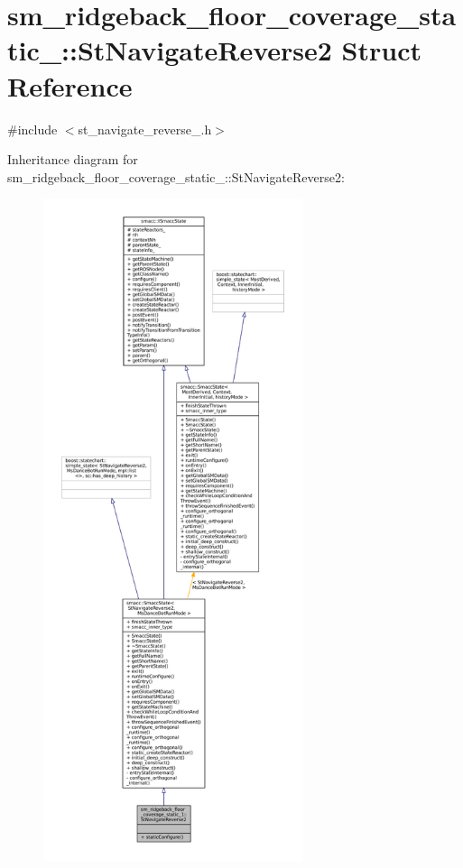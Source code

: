\hypertarget{structsm__ridgeback__floor__coverage__static__1_1_1StNavigateReverse2}{}\section{sm\+\_\+ridgeback\+\_\+floor\+\_\+coverage\+\_\+static\+\_\+:\+:St\+Navigate\+Reverse2 Struct Reference}
\label{structsm__ridgeback__floor__coverage__static__1_1_1StNavigateReverse2}


{\ttfamily \#include $<$st\+\_\+navigate\+\_\+reverse\+\_.\+h$>$}



Inheritance diagram for sm\+\_\+ridgeback\+\_\+floor\+\_\+coverage\+\_\+static\+\_\+:\+:St\+Navigate\+Reverse2\+:
\nopagebreak
\begin{figure}[H]
\begin{center}
\leavevmode
\includegraphics[height=550pt]{structsm__ridgeback__floor__coverage__static__1_1_1StNavigateReverse2__inherit__graph}
\end{center}
\end{figure}



